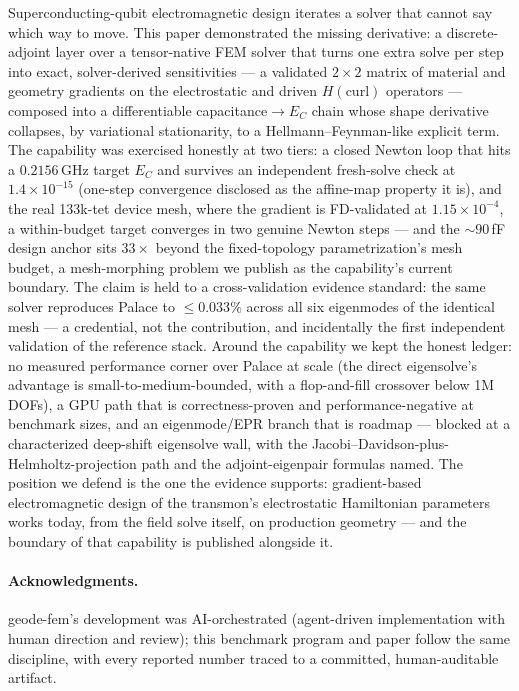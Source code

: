 \documentclass{anvil-paper}
\begin{document}
Superconducting-qubit electromagnetic design iterates a solver that
cannot say which way to move. This paper demonstrated the missing
derivative: a discrete-adjoint layer over a tensor-native FEM solver
that turns one extra solve per step into exact, solver-derived
sensitivities --- a validated $2\times 2$ matrix of material and
geometry gradients on the electrostatic and driven $H(\mathrm{curl})$
operators --- composed into a differentiable capacitance$\to E_C$ chain
whose shape derivative collapses, by variational stationarity, to a
Hellmann--Feynman-like explicit term. The capability was exercised
honestly at two tiers: a closed Newton loop that hits a $0.2156$\,GHz
target $E_C$ and survives an independent fresh-solve check at
$1.4\times10^{-15}$ (one-step convergence disclosed as the affine-map
property it is), and the real 133k-tet device mesh, where the gradient
is FD-validated at $1.15\times10^{-4}$, a within-budget target converges
in two genuine Newton steps --- and the ${\sim}90$\,fF design anchor
sits $33\times$ beyond the fixed-topology parametrization's mesh budget,
a mesh-morphing problem we publish as the capability's current boundary.
The claim is held to a cross-validation evidence standard: the same
solver reproduces Palace to $\leq 0.033\%$ across all six eigenmodes of
the identical mesh --- a credential, not the contribution, and
incidentally the first independent validation of the reference stack.
Around the capability we kept the honest ledger: no measured performance
corner over Palace at scale (the direct eigensolve's advantage is
small-to-medium-bounded, with a flop-and-fill crossover below 1M DOFs),
a GPU path that is correctness-proven and performance-negative at
benchmark sizes, and an eigenmode/EPR branch that is roadmap --- blocked
at a characterized deep-shift eigensolve wall, with the
Jacobi--Davidson-plus-Helmholtz-projection path and the adjoint-eigenpair
formulas named. The position we defend is the one the evidence supports:
gradient-based electromagnetic design of the transmon's electrostatic
Hamiltonian parameters works today, from the field solve itself, on
production geometry --- and the boundary of that capability is published
alongside it.

\paragraph{Acknowledgments.}
geode-fem's development was AI-orchestrated (agent-driven implementation
with human direction and review); this benchmark program and paper
follow the same discipline, with every reported number traced to a
committed, human-auditable artifact.



\end{document}
